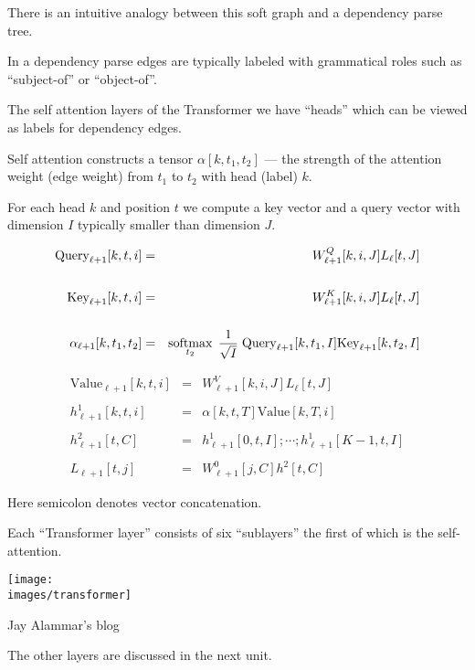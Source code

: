 {\vfill
There is an intuitive analogy between this soft graph and a dependency parse tree.


In a dependency parse edges are typically labeled with grammatical roles such as ``subject-of'' or ``object-of''.

\vfill
The self attention layers of the Transformer we have ``heads'' which can be viewed as labels for dependency edges.

\vfill
Self attention constructs a tensor $\alpha[k,t_1,t_2]$ --- the strength of the attention weight (edge weight)
from $t_1$ to $t_2$ with head (label) $k$.


For each head $k$ and position $t$ we compute a key vector and a query vector with dimension $I$ typically smaller than dimension $J$.

\begin{eqnarray*}
\mathrm{Query}_{\ell+1}[k,t,i] & = & W^Q_{\ell+1}[k,i,J]L_\ell[t,J] \\
\\
\mathrm{Key}_{\ell+1}[k,t,i] & = &  W^K_{\ell+1}[k,i,J]L_\ell[t,J] \\
\\
\alpha_{\ell+1}[k,t_1,t_2] & = & \operatorname*{softmax}_{t_2}\; \frac{1}{\sqrt{I}}\;\mathrm{Query}_{\ell+1}[k,t_1,I]\mathrm{Key}_{\ell+1}[k,t_2,I]
\end{eqnarray*}

      
\begin{eqnarray*}
\mathrm{Value}_{\ell+1}[k,t,i] & = & W^V_{\ell+1}[k,i,J]L_\ell[t,J] \\
\\
h^1_{\ell+1}[k,t,i] & = & \alpha[k,t,T]\mathrm{Value}[k,T,i] \\
\\
h^2_{\ell+1}[t,C] & = & h^1_{\ell+1}[0,t,I];\cdots;h^1_{\ell+1}[K-1,t,I] \\
\\
L_{\ell+1}[t,j] & = & W^0_{\ell+1}[j,C]h^2[t,C]
\end{eqnarray*}

\vfill
Here semicolon denotes vector concatenation.


Each ``Transformer layer'' consists of six ``sublayers'' the first of which is the self-attention.


\centerline{\texttt{[image: \\images/transformer]}}

{\Large
\centerline{Jay Alammar's blog}
}

The other layers are discussed in the next unit.


}

